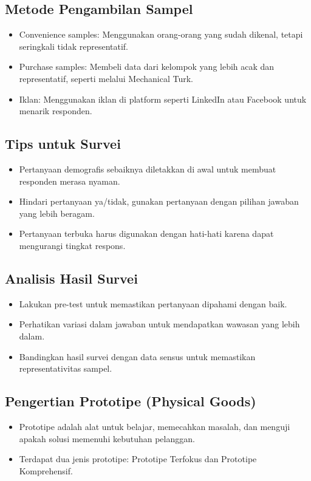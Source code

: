 \documentclass{article}
\begin{document}
\subsection{Metode Pengambilan Sampel}
\begin{itemize}
    \item Convenience samples: Menggunakan orang-orang yang sudah dikenal, tetapi seringkali tidak representatif.
    \item Purchase samples: Membeli data dari kelompok yang lebih acak dan representatif, seperti melalui Mechanical Turk.
    \item Iklan: Menggunakan iklan di platform seperti LinkedIn atau Facebook untuk menarik responden.
\end{itemize}

\subsection{Tips untuk Survei}
\begin{itemize}
    \item Pertanyaan demografis sebaiknya diletakkan di awal untuk membuat responden merasa nyaman.
    \item Hindari pertanyaan ya/tidak, gunakan pertanyaan dengan pilihan jawaban yang lebih beragam.
    \item Pertanyaan terbuka harus digunakan dengan hati-hati karena dapat mengurangi tingkat respons.
\end{itemize}

\subsection{Analisis Hasil Survei}
\begin{itemize}
    \item Lakukan pre-test untuk memastikan pertanyaan dipahami dengan baik.
    \item Perhatikan variasi dalam jawaban untuk mendapatkan wawasan yang lebih dalam.
    \item Bandingkan hasil survei dengan data sensus untuk memastikan representativitas sampel.
\end{itemize}

\subsection{Pengertian Prototipe (Physical Goods)}
\begin{itemize}
    \item Prototipe adalah alat untuk belajar, memecahkan masalah, dan menguji apakah solusi memenuhi kebutuhan pelanggan.
    \item Terdapat dua jenis prototipe: Prototipe Terfokus dan Prototipe Komprehensif.
\end{itemize}
\end{document}
